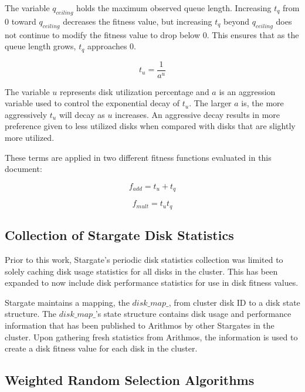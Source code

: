 \documentclass[12pt]{article}
\begin{document}
  The variable $q_{ceiling}$ holds the maximum observed queue length.
  Increasing $t_{q}$ from 0 toward $q_{ceiling}$ decreases the fitness value,
  but increasing $t_{q}$ beyond $q_{ceiling}$ does not continue to modify the
  fitness value to drop below 0. This ensures that as the queue length grows,
  $t_{q}$ approaches 0. 

  \begin{equation}
    t_{u} = \frac{1}{a^{u}}
  \end{equation}

  The variable $u$ represents disk utilization percentage and $a$ is an
  aggression variable used to control the exponential decay of $t_{u}$. The
  larger $a$ is, the more aggressively $t_{u}$ will decay as $u$ increases. An
  aggressive decay results in more preference given to less utilized disks when
  compared with disks that are slightly more utilized.

  These terms are applied in two different fitness functions evaluated in this
  document:

  \begin{equation} \label{eqn:additive-fitness}
    f_{add} = t_{u} + t_{q}
  \end{equation}

  \begin{equation} \label{eqn:multiplicative-fitness}
    f_{mult} = t_{u}t_{q}
  \end{equation}


  \subsection{Collection of Stargate Disk Statistics }

  Prior to this work, Stargate's periodic disk statistics collection was
  limited to solely caching disk usage statistics for all disks in the cluster.
  This has been expanded to now include disk performance statistics for use in
  disk fitness values.

  Stargate maintains a mapping, the $disk\_map\_$,
  from cluster disk ID to a disk state structure. The $disk\_map\_$'s state
  structure contains disk usage and performance information that has been
  published to Arithmos by other Stargates in the cluster. Upon gathering fresh
  statistics from Arithmos, the information is used to create a disk fitness value
  for each disk in the cluster.

  \subsection{Weighted Random Selection Algorithms}
\end{document}
